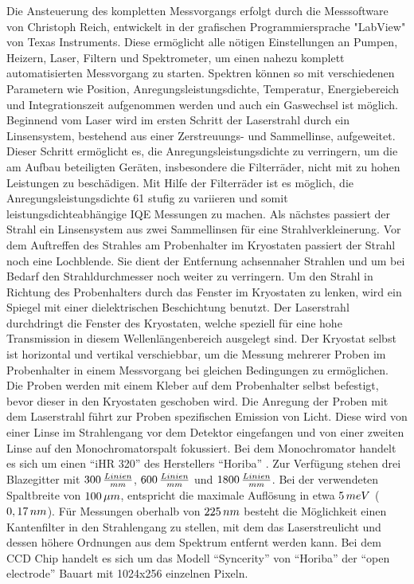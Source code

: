 Die Ansteuerung des kompletten Messvorgangs erfolgt durch die Messsoftware von Christoph Reich, entwickelt in der grafischen Programmiersprache "LabView" von Texas Instruments. Diese ermöglicht alle nötigen Einstellungen an Pumpen, Heizern, Laser, Filtern und Spektrometer, um einen nahezu komplett automatisierten Messvorgang zu starten. Spektren können so mit verschiedenen Parametern wie Position, Anregungsleistungsdichte, Temperatur, Energiebereich und Integrationszeit aufgenommen werden und auch ein Gaswechsel ist möglich.
\newline
Beginnend vom Laser wird im ersten Schritt der Laserstrahl durch ein Linsensystem, bestehend aus einer Zerstreuungs- und Sammellinse, aufgeweitet. Dieser Schritt ermöglicht es, die Anregungsleistungsdichte zu verringern, um die am Aufbau beteiligten Geräten, insbesondere die Filterräder, nicht mit zu hohen Leistungen zu beschädigen. Mit Hilfe der Filterräder ist es möglich, die Anregungsleistungsdichte 61 stufig zu variieren und somit leistungsdichteabhängige IQE Messungen zu machen. Als nächstes passiert der Strahl ein Linsensystem aus zwei Sammellinsen für eine Strahlverkleinerung. Vor dem Auftreffen des Strahles am Probenhalter im Kryostaten passiert der Strahl noch eine Lochblende. Sie dient der Entfernung achsennaher Strahlen und um bei Bedarf den Strahldurchmesser noch weiter zu verringern. Um den Strahl in Richtung des Probenhalters durch das Fenster im Kryostaten zu lenken, wird ein Spiegel mit einer dielektrischen Beschichtung benutzt. Der Laserstrahl durchdringt die Fenster des Kryostaten, welche speziell für eine hohe Transmission in diesem Wellenlängenbereich ausgelegt sind. Der Kryostat selbst ist horizontal und vertikal verschiebbar, um die Messung mehrerer Proben im Probenhalter in einem Messvorgang bei gleichen Bedingungen zu ermöglichen. Die Proben werden mit einem Kleber auf dem Probenhalter selbst befestigt, bevor dieser in den Kryostaten geschoben wird. 
Die Anregung der Proben mit dem Laserstrahl führt zur Proben spezifischen Emission von Licht. Diese wird von einer Linse im Strahlengang vor dem Detektor eingefangen und von einer zweiten Linse auf den Monochromatorspalt fokussiert.
Bei dem Monochromator handelt es sich um einen "`iHR 320"' des Herstellers "`Horiba"' . Zur Verfügung stehen drei Blazegitter mit $300 \thinspace \frac{Linien}{mm}$,
$600 \thinspace \frac{Linien}{mm}$ und $1800 \thinspace \frac{Linien}{mm}$. Bei der verwendeten Spaltbreite von $100 \thinspace \mu m$, entspricht die maximale Auflösung in etwa $5 \thinspace meV$ ($0,17 \thinspace nm$). Für Messungen oberhalb von $225 \thinspace nm$ besteht die Möglichkeit einen Kantenfilter in den Strahlengang zu stellen, mit dem das Laserstreulicht und dessen höhere Ordnungen aus dem Spektrum entfernt werden kann. Bei dem CCD Chip handelt es sich um das Modell "`Syncerity"' von "`Horiba"' der "`open electrode"' Bauart mit 1024x256 einzelnen Pixeln. 

